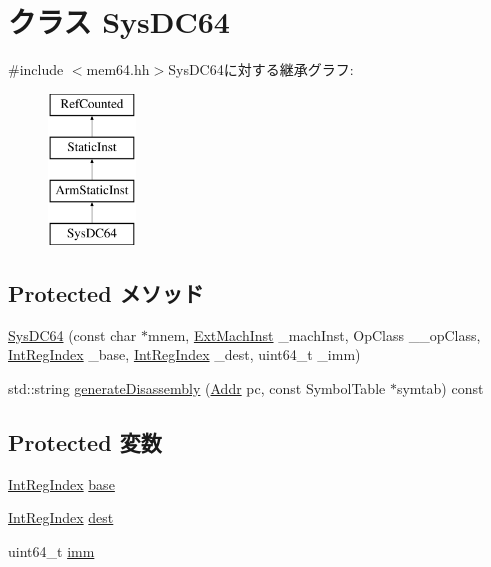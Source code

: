 \hypertarget{classArmISA_1_1SysDC64}{
\section{クラス SysDC64}
\label{classArmISA_1_1SysDC64}
}


{\ttfamily \#include $<$mem64.hh$>$}SysDC64に対する継承グラフ:\begin{figure}[H]
\begin{center}
\leavevmode
\includegraphics[height=4cm]{classArmISA_1_1SysDC64}
\end{center}
\end{figure}
\subsection*{Protected メソッド}
\begin{DoxyCompactItemize}
\item 
\hyperlink{classArmISA_1_1SysDC64_a54b1b64752414185c38e74f5f42bd479}{SysDC64} (const char $\ast$mnem, \hyperlink{classStaticInst_a5605d4fc727eae9e595325c90c0ec108}{ExtMachInst} \_\-machInst, OpClass \_\-\_\-opClass, \hyperlink{namespaceArmISA_ae64680ba9fb526106829d6bf92fc791b}{IntRegIndex} \_\-base, \hyperlink{namespaceArmISA_ae64680ba9fb526106829d6bf92fc791b}{IntRegIndex} \_\-dest, uint64\_\-t \_\-imm)
\item 
std::string \hyperlink{classArmISA_1_1SysDC64_a95d323a22a5f07e14d6b4c9385a91896}{generateDisassembly} (\hyperlink{classm5_1_1params_1_1Addr}{Addr} pc, const SymbolTable $\ast$symtab) const 
\end{DoxyCompactItemize}
\subsection*{Protected 変数}
\begin{DoxyCompactItemize}
\item 
\hyperlink{namespaceArmISA_ae64680ba9fb526106829d6bf92fc791b}{IntRegIndex} \hyperlink{classArmISA_1_1SysDC64_ad7a926fdfe0820284d654e9139a423b2}{base}
\item 
\hyperlink{namespaceArmISA_ae64680ba9fb526106829d6bf92fc791b}{IntRegIndex} \hyperlink{classArmISA_1_1SysDC64_aec72e8e45bdc87abeeeb75d2a8a9a716}{dest}
\item 
uint64\_\-t \hyperlink{classArmISA_1_1SysDC64_a2b4406ad2843b5aa12d244d01d8fdc69}{imm}
\end{DoxyCompactItemize}


